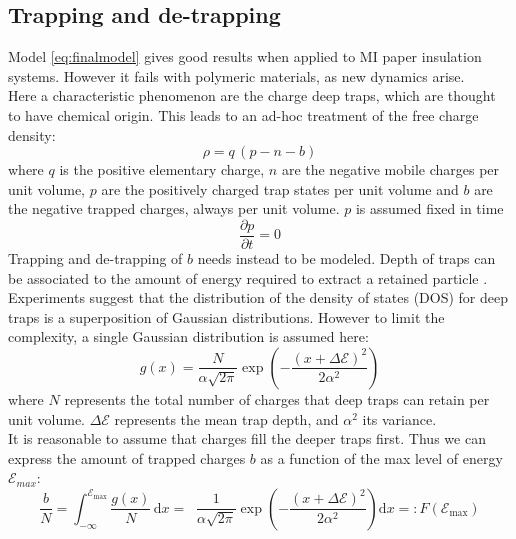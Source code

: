 \documentclass[11pt,a4paper]{article}
\begin{document}
\subsection{Trapping and de-trapping}
Model \eqref{eq:finalmodel} gives good results when applied to MI paper insulation systems. However it fails with polymeric materials, as new dynamics arise.\\
Here a characteristic phenomenon are the charge deep traps, which are thought to have chemical origin. This leads to an ad-hoc treatment of the free charge density:
\begin{equation}\label{eq:freechargetraps}
	\rho = q\,(p-n-b)
\end{equation}
where \(q\) is the positive elementary charge, \(n\) are the negative mobile charges per unit volume, \(p\) are the positively charged trap states per unit volume and \(b\) are the negative trapped charges, always per unit volume. \(p\) is assumed fixed in time
\begin{equation}
	\dfrac{\partial p}{\partial t} = 0
\end{equation}
Trapping and de-trapping of \(b\) needs instead to be modeled. Depth of traps can be associated to the amount of energy required to extract a retained particle \cite{circuitalmodel}. Experiments suggest that the distribution of the density of states (DOS)  for deep traps is a superposition of Gaussian distributions. However to limit the complexity, a single Gaussian distribution is assumed here:
\begin{equation}
	g(x) = \dfrac{N}{\alpha \sqrt{2 \pi}} \exp \left( -\dfrac{\left(x+\Delta \mathcal{E}\right)^{2}}
	{2 \alpha^{2}} \right)
\end{equation}
where \(N\) represents the total number of charges that deep traps can retain per unit volume. \(\Delta \mathcal{E}\) represents the mean trap depth, and \(\alpha^2\) its variance.\\
It is reasonable to assume that charges fill the deeper traps first. Thus we can express the amount of trapped charges \(b\) as a function of the max level of energy \(\mathcal{E}_{max}\):
\begin{equation}
	\dfrac{b}{N} = \displaystyle \int_{-\infty}^{\mathcal{E}_{\mathrm{max}}} \dfrac{g(x)}{N}\, \mathrm{d}x =
	\mathop{\int_{-\infty}^{\mathcal{E}_{\mathrm{max}}}} \frac{1}{\alpha \sqrt{2 \pi}} \exp \left( -\dfrac{\left(x+\Delta \mathcal{E}\right)^{2}}
	{2 \alpha^{2}} \right)\mathrm{d}x
	=: F\left(\mathcal{E}_{\mathrm{max}}\right)
\end{equation}
\end{document}
